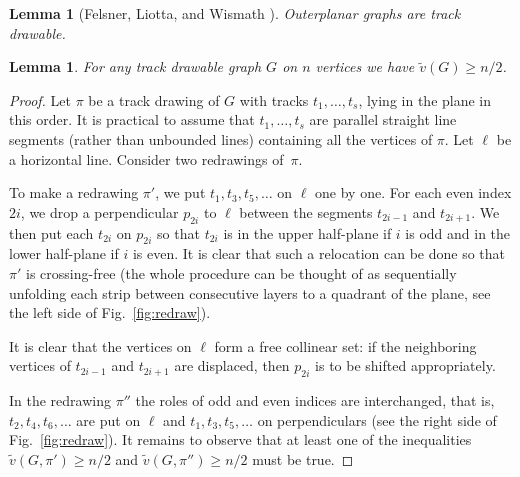 \documentclass[reqno,12pt]{amsart}
\newcommand{\free}[1]{\tilde v(#1)}
\newtheorem{lemma}[theorem]{Lemma}
\begin{document}
\begin{lemma}[Felsner, Liotta, and Wismath \cite{FelsnerLW03}]\label{lem:outerlayered}
Outerplanar graphs are track drawable.
\end{lemma}


\begin{lemma}\label{lem:layeredfree}
For any track drawable graph $G$ on $n$ vertices we have $\free G\ge n/2$.
\end{lemma}


\begin{proof}
Let $\pi$ be a track drawing of $G$ with tracks $t_1,\ldots,t_s$, 
lying in the plane in this order. It is practical to assume that
$t_1,\ldots,t_s$ are parallel straight line segments (rather than unbounded lines)
containing all the vertices of $\pi$. Let $\ell$ be a horizontal line.
Consider two redrawings of~$\pi$.

To make a redrawing $\pi'$, we put $t_1,t_3,t_5,\ldots$
on $\ell$ one by one. For each even index $2i$, 
we drop a perpendicular $p_{2i}$ to $\ell$ between the segments $t_{2i-1}$ and 
$t_{2i+1}$. We then put each $t_{2i}$ on $p_{2i}$ so that $t_{2i}$
is in the upper half-plane if $i$ is odd and in the lower half-plane if $i$ is
even. It is clear that such a relocation can be done so that $\pi'$
is crossing-free (the whole procedure can be thought of as sequentially unfolding 
each strip between consecutive layers to a quadrant of the plane, see the left side of
Fig.~\ref{fig:redraw}).

It is clear that the vertices on $\ell$ form a free collinear set:
if the neighboring vertices of $t_{2i-1}$ and $t_{2i+1}$ are displaced, then
$p_{2i}$ is to be shifted appropriately.

In the redrawing $\pi''$ the roles of odd and even indices are interchanged,
that is, $t_2,t_4,t_6,\ldots$ are put on $\ell$ and $t_1,t_3,t_5,\ldots$ 
on perpendiculars (see the right side of Fig.~\ref{fig:redraw}).
It remains to observe that at least one of the inequalities $\free{G,\pi'}\ge n/2$ 
and $\free{G,\pi''}\ge n/2$ must be true.
\end{proof}
\end{document}
